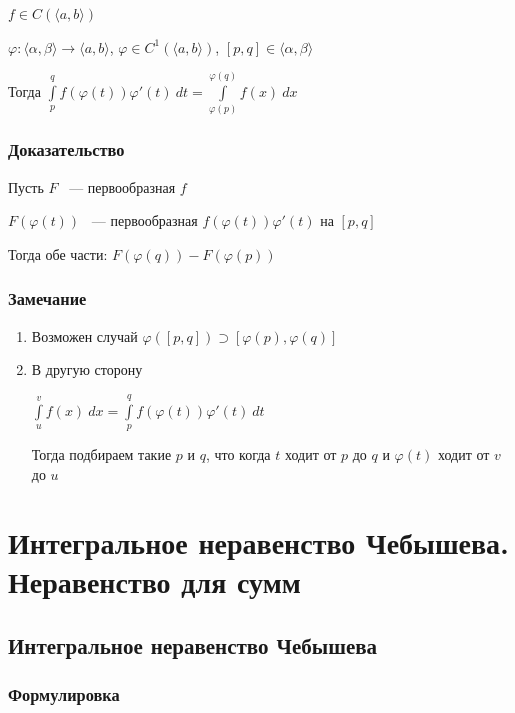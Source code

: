 \documentclass{article}
\begin{document}
                $f \in C(\langle a, b \rangle)$

                $\varphi : \langle \alpha, \beta \rangle \rightarrow \langle a, b \rangle$, $\varphi \in C^1 (\langle a, b \rangle)$, $[p, q] \in \langle \alpha, \beta \rangle$

                Тогда $\int\limits^q_p f(\varphi(t))\varphi'(t) \ dt = \int\limits^{\varphi(q)}_{\varphi(p)} f(x) \ dx$

			\subsubsection{Доказательство}

                Пусть $F$ ~--- первообразная $f$
	
                $F(\varphi(t))$ ~--- первообразная $f(\varphi(t))\varphi'(t)$ на $[p, q]$

                Тогда обе части: $F(\varphi(q)) - F(\varphi(p))$

			\subsubsection{Замечание}

			\begin{enumerate}

				\item Возможен случай $\varphi([p, q]) \supset [\varphi(p), \varphi(q)]$

				\item В другую сторону

					$\int\limits^v_u f(x) \ dx = \int\limits^q_p f(\varphi(t))\varphi'(t) \ dt$

					Тогда подбираем такие $p$ и $q$, что когда $t$ ходит от $p$ до $q$ и $\varphi(t)$ ходит от $v$ до $u$

			\end{enumerate}
	\newpage
	
	\section{Интегральное неравенство Чебышева. Неравенство для сумм}
	
		\subsection{Интегральное неравенство Чебышева}
		
            \subsubsection{Формулировка}
		
\end{document}
